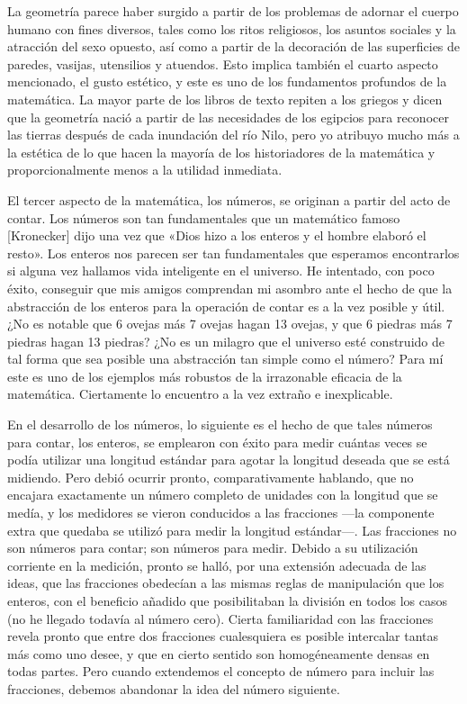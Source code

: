 \documentclass[a4paper, 12pt]{article}
\begin{document}
 

La geometría parece haber surgido a partir de los problemas de adornar el cuerpo humano con fines diversos, tales como los ritos religiosos, los asuntos sociales y la atracción del sexo opuesto, así como a partir de la decoración de las superficies de paredes, vasijas, utensilios y atuendos. Esto implica también el cuarto aspecto mencionado, el gusto estético, y este es uno de los fundamentos profundos de la matemática. La mayor parte de los libros de texto repiten a los griegos y dicen que la geometría nació a partir de las necesidades de los egipcios para reconocer las tierras después de cada inundación del río Nilo, pero yo atribuyo mucho más a la estética de lo que hacen la mayoría de los historiadores de la matemática y proporcionalmente menos a la utilidad inmediata.

 

El tercer aspecto de la matemática, los números, se originan a partir del acto de contar. Los números son tan fundamentales que un matemático famoso [Kronecker] dijo una vez que «Dios hizo a los enteros y el hombre elaboró el resto». Los enteros nos parecen ser tan fundamentales que esperamos encontrarlos si alguna vez hallamos vida inteligente en el universo. He intentado, con poco éxito, conseguir que mis amigos comprendan mi asombro ante el hecho de que la abstracción de los enteros para la operación de contar es a la vez posible y útil. ¿No es notable que 6 ovejas más 7 ovejas hagan 13 ovejas, y que 6 piedras más 7 piedras hagan 13 piedras? ¿No es un milagro que el universo esté construido de tal forma que sea posible una abstracción tan simple como el número? Para mí este es uno de los ejemplos más robustos de la irrazonable eficacia de la matemática. Ciertamente lo encuentro a la vez extraño e inexplicable.

 

En el desarrollo de los números, lo siguiente es el hecho de que tales números para contar, los enteros, se emplearon con éxito para medir cuántas veces se podía utilizar una longitud estándar para agotar la longitud deseada que se está midiendo. Pero debió ocurrir pronto, comparativamente hablando, que no encajara exactamente un número completo de unidades con la longitud que se medía, y los medidores se vieron conducidos a las fracciones ---la componente extra que quedaba se utilizó para medir la longitud estándar---. Las fracciones no son números para contar; son números para medir. Debido a su utilización corriente en la medición, pronto se halló, por una extensión adecuada de las ideas, que las fracciones obedecían a las mismas reglas de manipulación que los enteros, con el beneficio añadido que posibilitaban la división en todos los casos (no he llegado todavía al número cero). Cierta familiaridad con las fracciones revela pronto que entre dos fracciones cualesquiera es posible intercalar tantas más como uno desee, y que en cierto sentido son homogéneamente densas en todas partes. Pero cuando extendemos el concepto de número para incluir las fracciones, debemos abandonar la idea del número siguiente.
\end{document}
